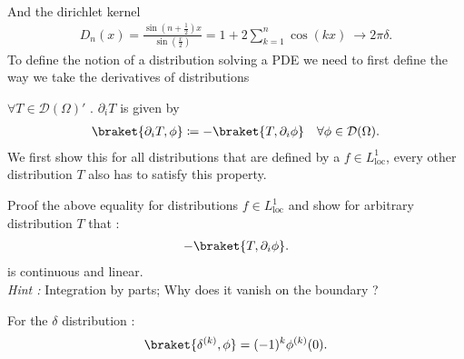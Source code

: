 \begin{figure}[H]
  \begin{center}
  \end{center}
\end{figure}
\hspace{0mm}\\
And the dirichlet kernel 
\begin{align*}
  D_n(x) = \frac{\sin(n+\frac{1}{2})x}{\sin(\frac{x}{2})} = 1+ 2\sum_{k=1}^{n}  \cos(kx)  \ \to 2\pi \delta 
.\end{align*} 
To define the notion of a distribution solving a PDE we need to first define the way we take the derivatives of distributions
\begin{definition}
  $\forall  T \in  \mathcal{D}(\Omega )'$ . $\partial_i T$ is given by  
  \begin{align*}
    \braket{\partial_i T, \phi } \coloneqq  - \braket{T,\partial_i \phi } \quad \forall  \phi  \in \mathcal{D}(\Omega )
  .\end{align*}
  We first show this for all distributions that are defined by a $f \in L_{\text{loc}}^{1} $, every other distribution $T$ also has to satisfy this property.
\end{definition}
\begin{exercise}
  Proof the above equality for distributions $f \in  L_{\text{loc}}^{1} $ and show for arbitrary distribution $T$ that :
  \begin{align*}
    -\braket{T,\partial_i \phi }
  .\end{align*}
  is continuous and linear.\\[1ex]
  \textit{Hint : } Integration by parts; Why does it vanish on the boundary ?
\end{exercise}
\begin{example}
 For the $\delta $  distribution : 
 \begin{align*}
   \braket{\delta ^{(k)},\phi  } = (-1)^{k} \phi ^{(k)}(0)
 .\end{align*}
\end{example}
